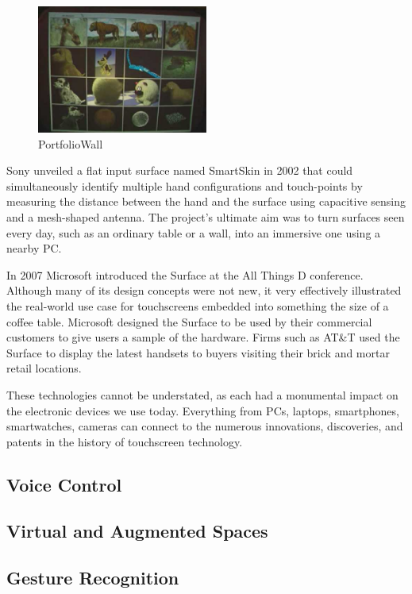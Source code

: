 \documentclass{article}
\begin{document}
\begin{figure}[!ht]
    \caption{PortfolioWall}
    \label{image:PFW}
    \centering
    \includegraphics[width=0.5\textwidth]{pics/pf_wall.jpg}
\end{figure}

Sony unveiled a flat input surface named SmartSkin in 2002 that could simultaneously identify multiple hand configurations and touch-points by measuring the distance between the hand and the surface using capacitive sensing and a mesh-shaped antenna.
The project's ultimate aim was to turn surfaces seen every day, such as an ordinary table or a wall, into an immersive one using a nearby PC.

In 2007 Microsoft introduced the Surface at the All Things D conference. Although many of its design concepts were not new, it very effectively illustrated the real-world use case for touchscreens embedded into something the size of a coffee table. Microsoft designed the Surface to be used by their commercial customers to give users a sample of the hardware. Firms such as AT\&T used the Surface to display the latest handsets to buyers visiting their brick and mortar retail locations.

These technologies cannot be understated, as each had a monumental impact on the electronic devices we use today. Everything from PCs, laptops, smartphones, smartwatches, cameras can connect to the numerous innovations, discoveries, and patents in the history of touchscreen technology.
\cite{ref8}


\subsection{Voice Control}

\newpage
\subsection{Virtual and Augmented Spaces}

\subsection{Gesture Recognition}
\end{document}
